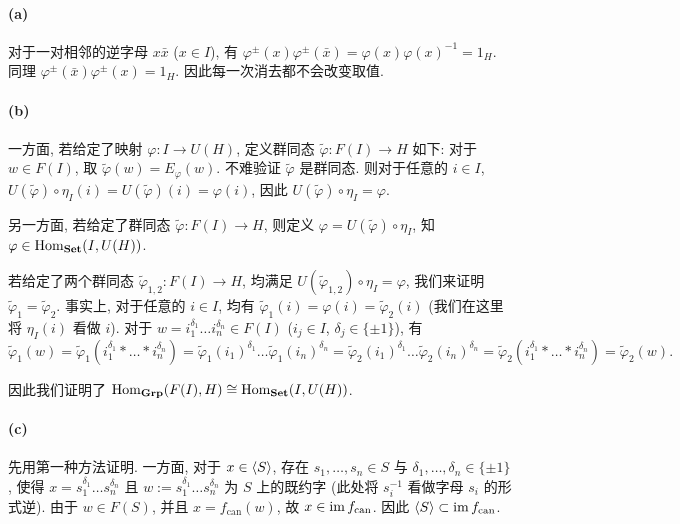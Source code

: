 \documentclass{article}
\begin{document}
\begin{solution}
	\paragraph{(a)} 对于一对相邻的逆字母 $x\bar{x}$ ($x \in I$), 有 $\varphi^{\pm}(x)\varphi^\pm(\bar{x}) = \varphi(x) \varphi (x) ^{-1} = 1_H$. 同理 $\varphi^\pm(\bar{x}) \varphi^\pm(x) = 1_H$. 因此每一次消去都不会改变取值.

	\paragraph{(b)} 一方面, 若给定了映射 $\varphi: I \to U(H)$, 定义群同态 $\tilde{\varphi}: F(I) \to H$ 如下: 对于 $w \in F(I)$, 取 $\tilde{\varphi}(w) = E_\varphi(w)$. 不难验证 $\tilde{\varphi}$ 是群同态. 则对于任意的 $i\in I$, $U(\tilde{\varphi}) \circ \eta_I(i) = U(\tilde{\varphi})(i) = \varphi(i)$, 因此 $U(\tilde{\varphi}) \circ \eta_I = \varphi$. 

	另一方面, 若给定了群同态 $\tilde{\varphi}: F(I) \to H$, 则定义 $\varphi = U(\tilde{\varphi}) \circ \eta_I$, 知 $\varphi \in \operatorname{Hom}_{\mathbf{Set}}(I,U(H))$.

	若给定了两个群同态 $\tilde{\varphi}_{1,2}: F(I) \to H$, 均满足 $U(\tilde{\varphi}_{1,2}) \circ \eta_I = \varphi$, 我们来证明 $\tilde{\varphi}_1 = \tilde{\varphi}_2$. 事实上, 对于任意的 $i \in I$, 均有 $\tilde{\varphi}_1(i) = \varphi(i) = \tilde{\varphi}_2(i)$ (我们在这里将 $\eta_I(i)$ 看做 $i$). 对于 $w = i_1^{\delta_1}\dots i_n^{\delta_n} \in F(I)$ ($i_j \in I	$, $\delta_j \in \{\pm 1\}$), 有
	\[ \tilde{\varphi}_1(w) 
	= \tilde{\varphi}_1(i_1^{\delta_1}*\dots * i_n^{\delta_n}) 
	=\tilde{\varphi}_1(i_1)^{\delta_1} \dots \tilde{\varphi}_1(i_n)^{\delta_n}
	=\tilde{\varphi}_2(i_1)^{\delta_1} \dots \tilde{\varphi}_2(i_n)^{\delta_n}
	= \tilde{\varphi}_2(i_1^{\delta_1}*\dots * i_n^{\delta_n})
	=\tilde{\varphi}_2(w). \]
	
	因此我们证明了 $\operatorname{Hom}_{\mathbf{Grp}}(F(I), H) \cong \operatorname{Hom}_{\mathbf{Set}}(I, U(H))$.

	\paragraph{(c)} 先用第一种方法证明. 一方面, 对于 $x \in \left\langle S \right\rangle$, 存在 $s_1, \dots, s_n \in S$ 与 $\delta_1, \dots, \delta_n \in \{\pm 1\}$, 使得 $x = s_1^{\delta_1}\dots s_n^{\delta_n}$ 且 $w := s_1^{\delta_1}\dots s_n^{\delta_n}$ 为 $S$ 上的既约字 (此处将 $s_i^{-1}$ 看做字母 $s_i$ 的形式逆). 由于 $w \in F(S)$, 并且 $x = f_{\mathrm{can}}(w)$, 故 $x \in \operatorname{im} f_{\mathrm{can}}$. 因此 $\left\langle S \right\rangle \subset \operatorname{im} f_{\mathrm{can}}$.


\end{solution}
\end{document}
